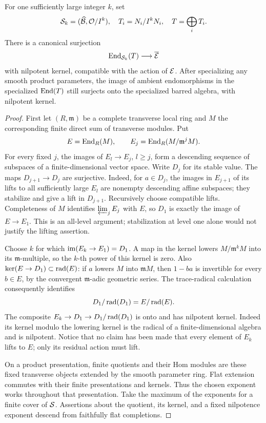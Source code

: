 \begin{lemma}\label{eu:truncated-end}
For one sufficiently large integer $k$, set
\[
 \mathcal S_k=(\widehat{\mathcal B},\mathcal O/I^k),\quad
 T_i=N_i/I^kN_i,\quad T=\bigoplus_iT_i.
\]
There is a canonical surjection
\begin{equation}\label{eu:full-end-quotient}
 \operatorname{End}_{\mathcal S_k}(T)\longrightarrow\overline{\mathcal E}
\end{equation}
with nilpotent kernel, compatible with the action of $\mathcal E$.
After specializing any smooth product parameters, the image of ambient
endomorphisms in the specialized $\operatorname{End}(T)$ still surjects onto the
specialized barred algebra, with nilpotent kernel.
\end{lemma}

\begin{proof}
First let $(R,\mathfrak m)$ be a complete transverse local ring and $M$
the corresponding finite direct sum of transverse modules.  Put
\[
 E=\operatorname{End}_R(M),\qquad E_j=\operatorname{End}_R(M/\mathfrak m^jM).
\]
For every fixed $j$, the images of $E_l\to E_j$, $l\ge j$, form a
descending sequence of subspaces of a finite-dimensional vector space.
Write $D_j$ for its stable value.  The maps $D_{j+1}\to D_j$ are
surjective.  Indeed, for $a\in D_j$, the images in $E_{j+1}$ of its
lifts to all sufficiently large $E_l$ are nonempty descending affine
subspaces; they stabilize and give a lift in $D_{j+1}$.  Recursively
choose compatible lifts.  Completeness of $M$ identifies
$\varprojlim_jE_j$ with $E$, so $D_1$ is exactly the image of $E\to E_1$.
This is an all-level argument; stabilization at level one alone would
not justify the lifting assertion.

Choose $k$ for which $\operatorname{im}(E_k\to E_1)=D_1$.  A map in the kernel lowers
$M/\mathfrak m^kM$ into its $\mathfrak m$-multiple, so the $k$-th power
of this kernel is zero.  Also $\ker(E\to D_1)\subset\operatorname{rad}(E)$: if $a$
lowers $M$ into $\mathfrak mM$, then $1-ba$ is invertible for every
$b\in E$, by the convergent $\mathfrak m$-adic geometric series.
The trace-radical calculation consequently identifies
\[
 D_1/\operatorname{rad}(D_1)=E/\operatorname{rad}(E).
\]
The composite $E_k\to D_1\to D_1/\operatorname{rad}(D_1)$ is onto and has nilpotent
kernel.  Indeed its kernel modulo the lowering kernel is the radical
of a finite-dimensional algebra and is nilpotent.  Notice that no
claim has been made that every element of $E_k$ lifts to $E$; only its
residual action must lift.

On a product presentation, finite quotients and their Hom modules are
these fixed transverse objects extended by the smooth parameter ring.
Flat extension commutes with their finite presentations and kernels.
Thus the chosen exponent works throughout that presentation.  Take
the maximum of the exponents for a finite cover of $\mathcal S$.  Assertions
about the quotient, its kernel, and a fixed nilpotence exponent descend
from faithfully flat completions.


\end{proof}
